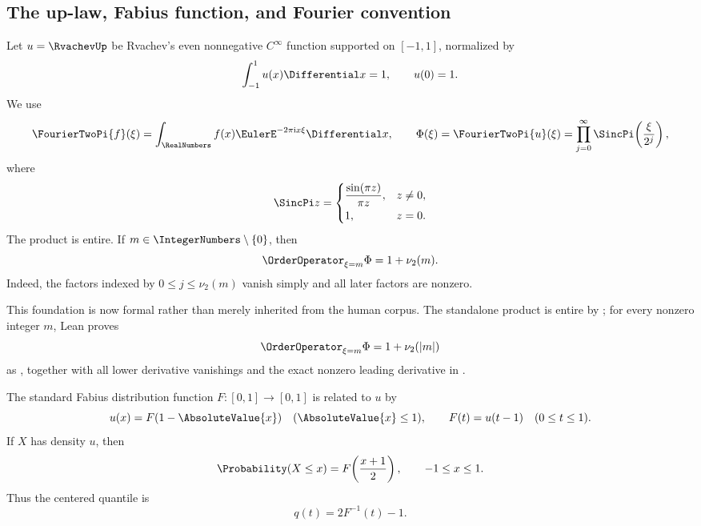 \documentclass[11pt,oneside]{article}
\numberwithin{equation}{section}
\theoremstyle{definition}
\theoremstyle{remark}
\begin{document}
\subsection{The up-law, Fabius function, and Fourier convention}

Let $u=\RvachevUp$ be Rvachev's even nonnegative $C^\infty$ function supported on $[-1,1]$, normalized by
\[
 \int_{-1}^{1}u(x)\Differential x=1,
 \qquad u(0)=1.
\]
We use
\begin{equation}
 \FourierTwoPi{f}(\xi)
 =\int_{\RealNumbers}f(x)\EulerE^{-2\pi\iu x\xi}\Differential x,
 \qquad
 \Phi(\xi)=\FourierTwoPi{u}(\xi)
 =\prod_{j=0}^{\infty}\SincPi\!\left(\frac{\xi}{2^j}\right),
 \label{p3:eq:Phi-product}
\end{equation}
where
\[
 \SincPi z=\begin{cases}\dfrac{\sin(\pi z)}{\pi z},&z\ne0,\\[0.4em]1,&z=0.\end{cases}
\]
The product is entire.  If $m\in\IntegerNumbers\setminus\{0\}$, then
\begin{equation}
 \OrderOperator_{\xi=m}\Phi=1+\nu_2(m).
 \label{p3:eq:integer-multiplicity}
\end{equation}
Indeed, the factors indexed by $0\le j\le\nu_2(m)$ vanish simply and all later factors are nonzero.

This foundation is now formal rather than merely inherited from the human
corpus.  The standalone product is entire by
; for every nonzero
integer \(m\), Lean proves
\[
 \OrderOperator_{\xi=m}\Phi=1+\nu_2(|m|)
\]
as , together with
all lower derivative vanishings and the exact nonzero leading derivative
in .

The standard Fabius distribution function $F:[0,1]\to[0,1]$ is related to $u$ by
\begin{equation}
 u(x)=F(1-\AbsoluteValue{x})\quad (\AbsoluteValue{x}\le1),
 \qquad
 F(t)=u(t-1)\quad(0\le t\le1).
 \label{p3:eq:F-up-relation}
\end{equation}
If $X$ has density $u$, then
\begin{equation}
 \Probability(X\le x)=F\!\left(\frac{x+1}{2}\right),
 \qquad -1\le x\le1.
 \label{p3:eq:centered-CDF}
\end{equation}
Thus the centered quantile is
\begin{equation}
 q(t)=2F^{-1}(t)-1.
 \label{p3:eq:centered-quantile}
\end{equation}
\end{document}
